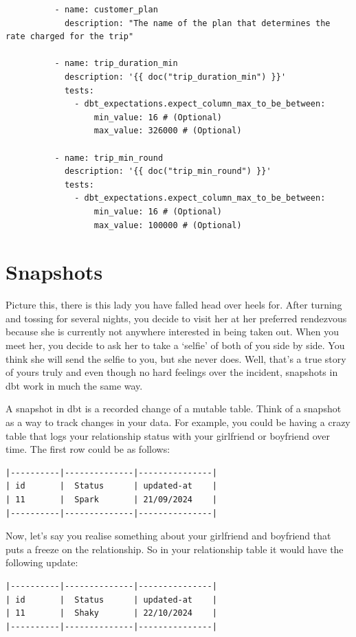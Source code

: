 \documentclass[
]{book}
\begin{document}
\begin{verbatim}
          - name: customer_plan
            description: "The name of the plan that determines the rate charged for the trip"

          - name: trip_duration_min
            description: '{{ doc("trip_duration_min") }}'
            tests:
              - dbt_expectations.expect_column_max_to_be_between:
                  min_value: 16 # (Optional)
                  max_value: 326000 # (Optional)

          - name: trip_min_round
            description: '{{ doc("trip_min_round") }}'
            tests:
              - dbt_expectations.expect_column_max_to_be_between:
                  min_value: 16 # (Optional)
                  max_value: 100000 # (Optional)
\end{verbatim}

\hypertarget{snapshots}{%
\chapter{Snapshots}\label{snapshots}}

Picture this, there is this lady you have falled head over heels for. After turning and tossing for several nights, you decide to visit her at her preferred rendezvous because she is currently not anywhere interested in being taken out. When you meet her, you decide to ask her to take a `selfie' of both of you side by side. You think she will send the selfie to you, but she never does. Well, that's a true story of yours truly and even though no hard feelings over the incident, snapshots in dbt work in much the same way.

A snapshot in dbt is a recorded change of a mutable table. Think of a snapshot as a way to track changes in your data. For example, you could be having a crazy table that logs your relationship status with your girlfriend or boyfriend over time. The first row could be as follows:

\begin{verbatim}
|----------|--------------|---------------|
| id       |  Status      | updated-at    |
| 11       |  Spark       | 21/09/2024    |
|----------|--------------|---------------|
\end{verbatim}

Now, let's say you realise something about your girlfriend and boyfriend that puts a freeze on the relationship. So in your relationship table it would have the following update:

\begin{verbatim}
|----------|--------------|---------------|
| id       |  Status      | updated-at    |
| 11       |  Shaky       | 22/10/2024    |
|----------|--------------|---------------|
\end{verbatim}
\end{document}
